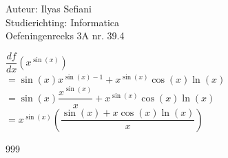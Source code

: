 \documentclass[a4paper]{article}
\begin{document}
\noindent \large Auteur: Ilyas Sefiani \\
\noindent \large Studierichting: Informatica\\
\noindent \large Oefeningenreeks 3A nr. 39.4\\

\medskip

\normalsize

$\dfrac{df}{dx}(x^{\sin(x)})$\\

$= \sin(x)x^{\sin(x)-1}+x^{\sin(x)}\cos(x)\ln(x)$\\

$= \sin(x)\dfrac{x^{\sin(x)}}{x}+x^{\sin(x)}\cos(x)\ln(x)$\\  

$= x^{\sin(x)}\left(\dfrac{\sin(x)+x\cos(x)\ln(x)}{x}\right)$\\

\begin{thebibliography}{999}
\end{thebibliography}
\end{document}

